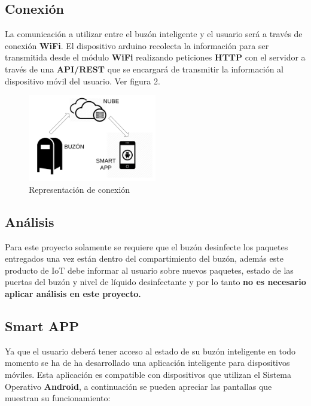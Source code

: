 \documentclass[osajnl,twocolumn,showpacs,superscriptaddress,10pt]{revtex4-1}
\begin{document}
\subsection{Conexión}
    La comunicación a utilizar entre el buzón inteligente y el usuario será a través de conexión \textbf{WiFi}. El dispositivo arduino recolecta la información para ser transmitida desde el módulo \textbf{WiFi} realizando peticiones \textbf{HTTP} con el servidor a través de una \textbf{API/REST} que se encargará de transmitir la información al dispositivo móvil del usuario. Ver figura 2. \newline
\begin{figure} [H] \centering 
\caption{Representación de conexión}

\includegraphics[width=0.5\textwidth]{conection.png} 
\end{figure}
\subsection{Análisis}
    Para este proyecto solamente se requiere que el buzón desinfecte los paquetes entregados una vez están dentro del compartimiento del buzón, además este producto de IoT debe informar al usuario sobre nuevos paquetes, estado de las puertas del buzón y nivel de líquido desinfectante y por lo tanto \textbf{no es necesario aplicar análisis en este proyecto.}
\subsection{Smart APP}
    Ya que el usuario deberá tener acceso al estado de su buzón inteligente en todo momento se ha de ha desarrollado una aplicación inteligente para dispositivos móviles. Esta aplicación es compatible con dispositivos que utilizan el Sistema Operativo \textbf{Android}, a continuación se pueden apreciar las pantallas que muestran su funcionamiento:
    
\end{document}
